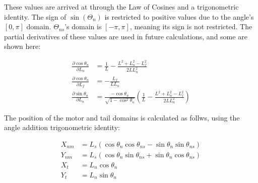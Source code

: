 \documentclass[10pt]{article} %
\begin{document}
These values are arrived at through the Law of Cosines and a trigonometric identity. The sign of $\sin\left(\Theta_n\right)$ is restricted to positive values due to the angle's $[0,\pi]$ domain. $\Theta_{ns}$'s domain is $[-\pi,\pi]$, meaning its sign is not restricted. The partial derivatives of these values are used in future calculations, and some are shown here:

\begin{align}
  \frac{\partial \cos\theta_n}{\partial L_n} &= \frac{1}{L} - \frac{L^2 + L_n^2 - L_f^2}{2L L_n^2}\\
  \frac{\partial \cos\theta_n}{\partial L_f} &= -\frac{L_f}{LL_n}\\
  \frac{\partial \sin\theta_n}{\partial L_n} &= \frac{-\cos\theta_n}{\sqrt{1-\cos^2\theta_n}}
  \left(\frac{1}{L} - \frac{L^2 + L_n^2 - L_f^2}{2L L_n^2}\right)
\end{align}

The position of the motor and tail domains is calculated as follws, using the angle addition trigonometric identity:

\begin{align}
  X_{nm} &= L_s\left(
  \cos\theta_n\cos\theta_{ns} - \sin\theta_n\sin\theta_{ns}
  \right)
  \\
  Y_{nm} &= L_s\left(
  \cos\theta_n\sin\theta_{ns} + \sin\theta_n\cos\theta_{ns}
  \right)
  \\
  X_{t} &= L_n\cos\theta_n\\
  Y_{t} &= L_n\sin\theta_n
\end{align}
\end{document}
